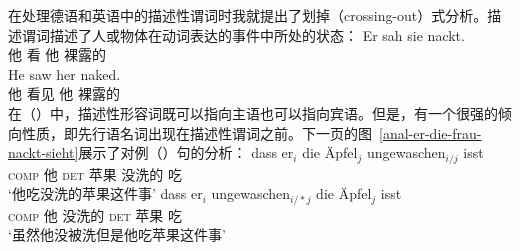 在处理德语和英语中的描述性谓词时我就提出了划掉（crossing-out）式分析\citep{Mueller2004c,Mueller2008a}。描述谓词描述了人或物体在动词表达的事件中所处的状态：
\eal
\ex 
\gll Er sah sie nackt.\footnotemark\\
	他 看 他 裸露的\\
\ex 
\gll He saw her naked.\\
	他 看见 他 裸露的\\
\zl
在（）中，描述性形容词既可以指向主语也可以指向宾语。但是，有一个很强的倾向性质，即先行语名词出现在描述性谓词之前\citep[]{Loetscher85}。下一页的图~\vref{anal-er-die-frau-nackt-sieht}展示了对例（）句的分析：
\eal
\ex 
\gll dass er$_i$ die Äpfel$_j$ ungewaschen$_{i/j}$ isst\\
	 \textsc{comp} 他 \textsc{det} 苹果 没洗的 吃\\
\glt `他吃没洗的苹果这件事'
\ex 
\gll dass er$_i$ ungewaschen$_{i/*j}$ die Äpfel$_j$ isst\\
	 \textsc{comp} 他 没洗的 \textsc{det} 苹果 吃\\
\glt `虽然他没被洗但是他吃苹果这件事'
\zl
